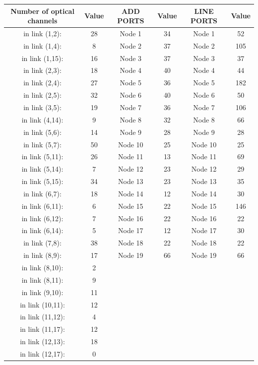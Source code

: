 \begin{table}[h!]
\centering
\begin{tabular}{|| c | c || c | c || c | c ||}
 \hline
 Number of optical channels & Value & ADD PORTS & Value & LINE PORTS & Value \\
 \hline\hline
in link (1,2): & 28& Node 1 & 34 & Node 1 & 52 \\
in link (1,4): & 8& Node 2 & 37 & Node 2 & 105 \\
in link (1,15): & 16& Node 3 & 37 & Node 3 & 37 \\
in link (2,3): & 18& Node 4 & 40 & Node 4 & 44 \\
in link (2,4): & 27& Node 5 & 36 & Node 5 & 182 \\
in link (2,5): & 32& Node 6 & 40 & Node 6 & 50 \\
in link (3,5): & 19& Node 7 & 36 & Node 7 & 106 \\
in link (4,14): & 9& Node 8 & 32 & Node 8 & 66 \\
in link (5,6): & 14& Node 9 & 28 & Node 9 & 28 \\
in link (5,7): & 50& Node 10 & 25 & Node 10 & 25 \\
in link (5,11): & 26& Node 11 & 13 & Node 11 & 69 \\
in link (5,14): & 7& Node 12 & 23 & Node 12 & 29 \\
in link (5,15): & 34& Node 13 & 23 & Node 13 & 35 \\
in link (6,7): & 18& Node 14 & 12 & Node 14 & 30 \\
in link (6,11): & 6& Node 15 & 22 & Node 15 & 146 \\
in link (6,12): & 7 &Node 16 & 22 & Node 16 & 22 \\
in link (6,14): & 5& Node 17 & 12 & Node 17 & 30 \\
in link (7,8): & 38& Node 18 & 22 & Node 18 & 22 \\
in link (8,9): & 17& Node 19 & 66 & Node 19 & 66 \\
in link (8,10): & 2& & & & \\
in link (8,11): & 9& & & & \\
in link (9,10): & 11& & & & \\
in link (10,11): & 12& & & & \\
in link (11,12): & 4& & & & \\
in link (11,17): & 12& & & & \\
in link (12,13): & 18& & & & \\
in link (12,17): & 0& & & & \\

\end{tabular}
\end{table}
